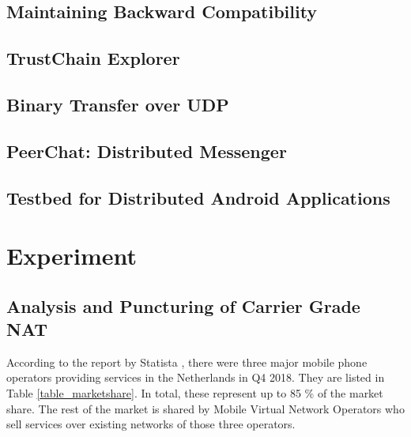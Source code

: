 


\section{Maintaining Backward Compatibility}

\section{TrustChain Explorer}

\section{Binary Transfer over UDP}

\section{PeerChat: Distributed Messenger}

\section{Testbed for Distributed Android Applications}


\chapter{Experiment}

\section{Analysis and Puncturing of Carrier Grade NAT}

According to the report by Statista \cite{statista:marketshare}, there were three major mobile phone operators providing services in the Netherlands in Q4 2018. They are listed in Table \ref{table_marketshare}. In total, these represent up to 85 \% of the market share. The rest of the market is shared by Mobile Virtual Network Operators who sell services over existing networks of those three operators.

